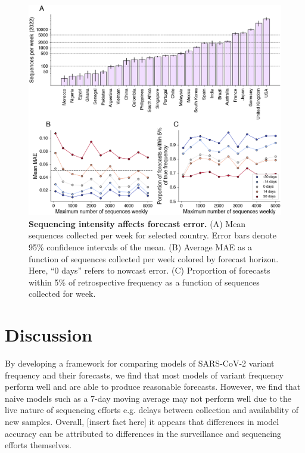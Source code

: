 \documentclass[11pt,oneside,letterpaper]{article}
\begin{document}
\begin{figure}[H]
    \centering
    \includegraphics[width=0.8\linewidth]{figures/downscaling_sequencing.png}
    \caption{\textbf{Sequencing intensity affects forecast error.}
    (A) Mean sequences collected per week for selected country. Error bars denote 95\% confidence intervals of the mean. 
    (B) Average MAE as a function of sequences collected per week colored by forecast horizon. Here, ``0 days'' refers to nowcast error. 
    (C) Proportion of forecasts within 5\% of retrospective frequency as a function of sequences collected for week.  }%
    \label{fig:downscaling}
\end{figure}

\section*{Discussion}




By developing a framework for comparing models of SARS-CoV-2 variant frequency and their forecasts, we find that most models of variant frequency perform well and are able to produce reasonable forecasts.
However, we find that naive models such as a 7-day moving average may not perform well due to the live nature of sequencing efforts e.g. delays between collection and availability of new samples.
Overall, [insert fact here] it appears that differences in model accuracy can be attributed to differences in the surveillance and sequencing efforts themselves.
\end{document}
